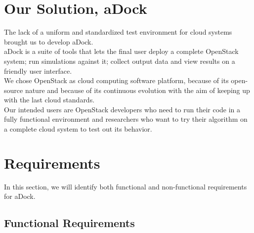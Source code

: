 
%
%




\section{Our Solution, aDock}
\label{sec:adock_intro}
The lack of a uniform and standardized test environment for cloud systems brought us to develop aDock.\\
aDock is a suite of tools that lets the final user deploy a complete OpenStack system; run simulations against it; collect output data and view results on a friendly user interface.\\
We chose OpenStack as cloud computing software platform, because of its open-source nature and because of its continuous evolution with the aim of keeping up with the last cloud standards.\\
Our intended users are OpenStack developers who need to run their code in a fully functional environment and researchers who want to try their algorithm on a complete cloud system to test out its behavior.

\section{Requirements}
\label{sec:adock_reqs}
In this section, we will identify both functional and non-functional requirements for aDock.

\subsection{Functional Requirements}
\label{sub:func_req}

